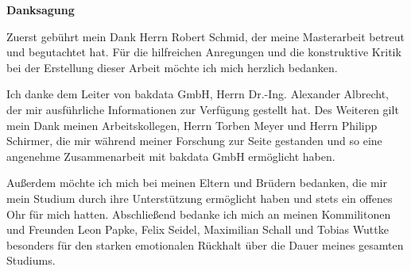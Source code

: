 \vspace*{\fill}
\begin{center}\textsf{\textbf{Danksagung}}\end{center}

\noindent Zuerst gebührt mein Dank Herrn Robert Schmid, der meine Masterarbeit betreut und begutachtet hat. Für die hilfreichen Anregungen und die konstruktive Kritik bei der Erstellung dieser Arbeit möchte ich mich herzlich bedanken.

\noindent Ich danke dem Leiter von bakdata GmbH, Herrn Dr.-Ing. Alexander Albrecht, der mir ausführliche Informationen zur Verfügung gestellt hat. Des Weiteren gilt mein Dank meinen Arbeitskollegen, Herrn Torben Meyer und Herrn Philipp Schirmer, die mir während meiner Forschung zur Seite gestanden und so eine angenehme Zusammenarbeit mit bakdata GmbH ermöglicht haben.

\noindent Außerdem möchte ich mich bei meinen Eltern und Brüdern bedanken, die mir mein Studium durch ihre Unterstützung ermöglicht haben und stets ein offenes Ohr für mich hatten. Abschließend bedanke ich mich an meinen Kommilitonen und Freunden Leon Papke, Felix Seidel, Maximilian Schall und Tobias Wuttke besonders für den starken emotionalen Rückhalt über die Dauer meines gesamten Studiums.

\vspace*{\fill}